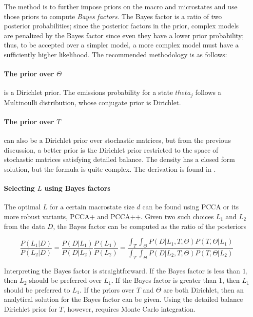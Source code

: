 \documentclass{article}
\begin{document}
The method is to further impose priors on the macro and microstates and use those priors to compute \textit{Bayes factors}. The Bayes factor is a ratio of two posterior probabilities; since the posterior factors in the prior, complex models are penalized by the Bayes factor since even they have a lower prior probability; thus, to be accepted over a simpler model, a more complex model must have a sufficiently higher likelihood. The recommended methodology is as follows:

\paragraph{The prior over $\Theta$} is a Dirichlet prior. The emissions probability for a state $theta_j$ follows a Multinoulli distribution, whose conjugate prior is Dirichlet. 

\paragraph{The prior over $T$} can also be a Dirichlet prior over stochastic matrices, but from the previous discussion, a better prior is the Dirichlet prior restricted to the space of stochastic matrices satisfying detailed balance. The density has a closed form solution, but the formula is quite complex. The derivation is found in \cite{diaconis}.

\paragraph{Selecting $L$ using Bayes factors} The optimal $L$ for a certain macrostate size $d$ can be found using PCCA or its more robust variants, PCCA+ and PCCA++. Given two such choices $L_1$ and $L_2$ from the data $D$, the Bayes factor can be computed as the ratio of the posteriors

$$\dfrac{P(L_1 | D)}{P(L_2|D)} = \dfrac{P(D|L_1)}{P(D|L_2)}\dfrac{P(L_1)}{P(L_2)} 
= \dfrac{\int_T \int_\Theta P(D|L_1, T, \Theta)P(T, \Theta | L_1)}
{\int_T \int_\Theta P(D|L_2,T,\Theta)P(T, \Theta | L_2)}$$

Interpreting the Bayes factor is straightforward. If the Bayes factor is less than $1$, then $L_2$ should be preferred over $L_1$. If the Bayes factor is greater than $1$, then $L_1$ should be preferred to $L_1$. If the priors over $T$ and $\Theta$ are both Dirichlet, then an analytical solution for the Bayes factor can be given. Using the detailed balance Dirichlet prior for $T$, however, requires Monte Carlo integration.
\end{document}
